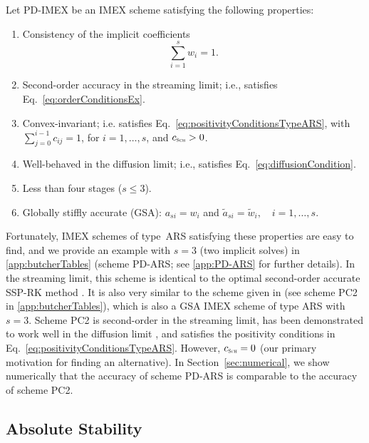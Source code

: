 \begin{define}
  Let PD-IMEX be an IMEX scheme satisfying the following properties:
  \begin{enumerate}
    \item Consistency of the implicit coefficients
    \begin{equation}
      \sum_{i=1}^{s}w_{i}=1.
      \label{eq:implicitConsistency}
    \end{equation}
    \item Second-order accuracy in the streaming limit; i.e., satisfies Eq.~\eqref{eq:orderConditionsEx}.
    \item Convex-invariant; i.e. satisfies Eq.~\eqref{eq:positivityConditionsTypeARS}, with $\sum_{j=0}^{i-1}c_{ij}=1$, for $i=1,\ldots,s$, and $c_{\textnormal{\tiny\textsc{Sch}}}>0$.
    \item Well-behaved in the diffusion limit; i.e., satisfies Eq.~\eqref{eq:diffusionCondition}.
    \item Less than four stages ($s\le3$).
    \item Globally stiffly accurate (GSA): $a_{si}=w_{i}$ and $\tilde{a}_{si}=\tilde{w}_{i},\quad i=1,\ldots,s$.
  \end{enumerate}
  \label{def:PD-IMEX}
\end{define}
Fortunately, IMEX schemes of type~ARS satisfying these properties are easy to find, and we provide an example with $s=3$ (two implicit solves) in \ref{app:butcherTables} (scheme PD-ARS; see \ref{app:PD-ARS} for further details).  
In the streaming limit, this scheme is identical to the optimal second-order accurate SSP-RK method \cite{gottlieb_etal_2001}.  
It is also very similar to the scheme given in \cite{mcclarren_etal_2008} (see scheme PC2 in \ref{app:butcherTables}), which is also a GSA IMEX scheme of type ARS with $s=3$.  
Scheme PC2 is second-order in the streaming limit, has been demonstrated to work well in the diffusion limit \cite{mcclarren_etal_2008,radice_etal_2013}, and satisfies the positivity conditions in Eq.~\eqref{eq:positivityConditionsTypeARS}.  
However, $c_{\textnormal{\tiny\textsc{Sch}}}=0$ (our primary motivation for finding an alternative).  
In Section~\ref{sec:numerical}, we show numerically that the accuracy of scheme PD-ARS is comparable to the accuracy of scheme PC2.  

\subsection{Absolute Stability}

